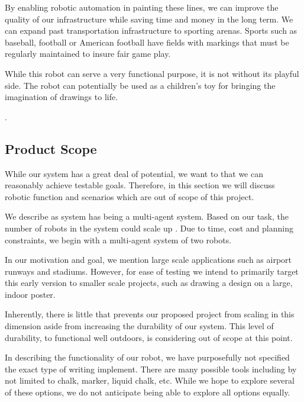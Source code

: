 By enabling robotic automation in painting these lines, we can improve the quality of our infrastructure while saving time and money in the long term. We can expand past transportation infrastructure to sporting arenas. Sports such as baseball, football or American football have fields with markings that must be regularly maintained to insure fair game play. 

While this robot can serve a very functional purpose, it is not without its playful side. The robot can potentially be used as a children's toy for bringing the imagination of drawings to life. 

.

\subsection{Product Scope}
\label{sec:project_scope}
While our  system has a great deal of potential, we want to  that we can reasonably achieve testable goals. Therefore, in this section we will discuss robotic function and scenarios which are out of scope of this project. 

We describe as system has being a multi-agent system. Based on our task, the number of robots in the system could scale up . Due to time, cost and planning constraints, we begin with a multi-agent system of two  robots. 

In our motivation and goal, we mention large scale applications such as airport runways and stadiums. However, for ease of testing we intend to primarily target this early version to smaller scale projects, such as drawing a design on a large, indoor poster. 

Inherently, there is little that prevents our proposed project from scaling in this dimension aside from increasing the durability of our system. This level of durability, to functional well outdoors, is considering out of scope at this point. 

In describing the functionality of our robot, we have purposefully not specified the exact type of writing implement. There are many possible tools including by not limited to chalk,  marker, liquid chalk, etc. While we hope to explore several of these options, we do not anticipate being able to explore all options equally. 

